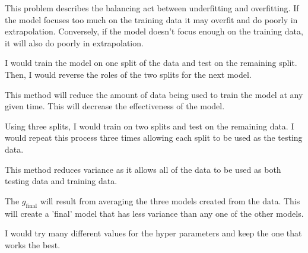 \documentclass[12pt]{article}
\begin{document}
\begin{enumerate}


This problem describes the balancing act between underfitting and overfitting. If the model focuses too much on the training data it may overfit and do poorly in extrapolation. Conversely, if the model doesn't focus enough on the training data, it will also do poorly in extrapolation. 


I would train the model on one split of the data and test on the remaining split. Then, I would reverse the roles of the two splits for the next model. 


This method will reduce the amount of data being used to train the model at any given time. This will decrease the effectiveness of the model.


Using three splits, I would train on two splits and test on the remaining data. I would repeat this process three times allowing each split to be used as the testing data. 


This method reduces variance as it allows all of the data to be used as both testing data and training data. 


The $g_{\text{final}}$ will result from averaging the three models created from the data. This will create a 'final' model that has less variance than any one of the other models. 


I would try many different values for the hyper parameters and keep the one that works the best. 


\end{enumerate}
\end{document}
